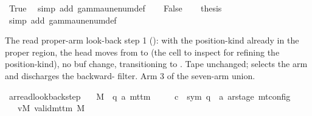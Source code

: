 \begin{isabellebody}
\ True\ \isamarkupfalse%
\ {\isacharparenleft}{\kern0pt}simp\ add{\isacharcolon}{\kern0pt}\ gamma{\isacharunderscore}{\kern0pt}unenum{\isacharunderscore}{\kern0pt}def{\isacharparenright}{\kern0pt}\isanewline
{}\isamarkupfalse%
\isanewline
\ \ \isamarkupfalse%
\ False\isanewline
\ \ \isamarkupfalse%
\ {\isacharquery}{\kern0pt}thesis\ \isamarkupfalse%
\ {\isacharparenleft}{\kern0pt}simp\ add{\isacharcolon}{\kern0pt}\ gamma{\isacharunderscore}{\kern0pt}unenum{\isacharunderscore}{\kern0pt}def{\isacharparenright}{\kern0pt}\isanewline
{}\isamarkupfalse%
%
\endisatagproof
{\isafoldproof}%
%
\isadelimproof
%
\endisadelimproof
%
\begin{isamarkuptext}%
The read proper-arm look-back step 1 (): with the
  position-kind already in the proper region, the head moves 
  from  to  (the cell to
  inspect for refining the position-kind), no buf change, transitioning
  to .  Tape unchanged;  selects the
  arm and discharges the backward- filter.  Arm 3 of the
  seven-arm union.%
\end{isamarkuptext}\isamarkuptrue%
\isamarkupfalse%
\ ar{\isacharunderscore}{\kern0pt}read{\isacharunderscore}{\kern0pt}lookback{}{\isacharunderscore}{\kern0pt}step{\isacharcolon}{\kern0pt}\isanewline
\ \ \ M\ {\isacharcolon}{\kern0pt}{\isacharcolon}{\kern0pt}\ {\isachardoublequoteopen}{\isacharparenleft}{\kern0pt}{\isacharprime}{\kern0pt}q{\isacharcomma}{\kern0pt}\ {\isacharprime}{\kern0pt}a{\isacharparenright}{\kern0pt}\ mttm{\isachardoublequoteclose}\isanewline
\ \ \ \ \ c{\isacharprime}{\kern0pt}\ {\isacharcolon}{\kern0pt}{\isacharcolon}{\kern0pt}\ {\isachardoublequoteopen}{\isacharparenleft}{\kern0pt}sym{}{\isacharcomma}{\kern0pt}\ {\isacharprime}{\kern0pt}q\ {\isasymtimes}\ {\isacharprime}{\kern0pt}a\ ar{\isacharunderscore}{\kern0pt}stage{\isacharparenright}{\kern0pt}\ mt{\isacharunderscore}{\kern0pt}config{\isachardoublequoteclose}\isanewline
\ \ \ vM{\isacharcolon}{\kern0pt}\ {\isachardoublequoteopen}valid{\isacharunderscore}{\kern0pt}mttm\ M{\isachardoublequoteclose}\isanewline

\end{isabellebody}
